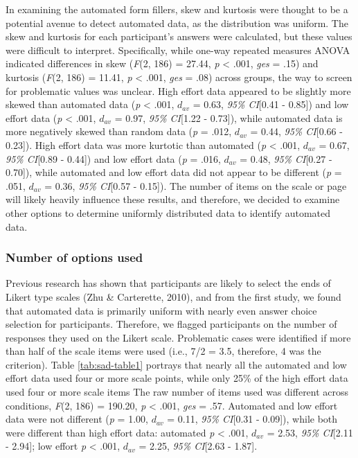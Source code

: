 \documentclass[english,man]{apa6}
\theoremstyle{definition}
\theoremstyle{definition}
\theoremstyle{definition}
\theoremstyle{remark}
\begin{document}
In examining the automated form fillers, skew and kurtosis were thought
to be a potential avenue to detect automated data, as the distribution
was uniform. The skew and kurtosis for each participant's answers were
calculated, but these values were difficult to interpret. Specifically,
while one-way repeated measures ANOVA indicated differences in skew
(\emph{F}(2, 186) = 27.44, \emph{p} \textless{} .001, \emph{ges} = .15)
and kurtosis (\emph{F}(2, 186) = 11.41, \emph{p} \textless{} .001,
\emph{ges} = .08) across groups, the way to screen for problematic
values was unclear. High effort data appeared to be slightly more skewed
than automated data (\emph{p} \textless{} .001, \(d_{av}\) = 0.63,
\emph{95\% CI}{[}0.41 - 0.85{]}) and low effort data (\emph{p}
\textless{} .001, \(d_{av}\) = 0.97, \emph{95\% CI}{[}1.22 - 0.73{]}),
while automated data is more negatively skewed than random data
(\emph{p} = .012, \(d_{av}\) = 0.44, \emph{95\% CI}{[}0.66 - 0.23{]}).
High effort data was more kurtotic than automated (\emph{p} \textless{}
.001, \(d_{av}\) = 0.67, \emph{95\% CI}{[}0.89 - 0.44{]}) and low effort
data (\emph{p} = .016, \(d_{av}\) = 0.48, \emph{95\% CI}{[}0.27 -
0.70{]}), while automated and low effort data did not appear to be
different (\emph{p} = .051, \(d_{av}\) = 0.36, \emph{95\% CI}{[}0.57 -
0.15{]}). The number of items on the scale or page will likely heavily
influence these results, and therefore, we decided to examine other
options to determine uniformly distributed data to identify automated
data.

\subsubsection{Number of options used}\label{number-of-options-used}

Previous research has shown that participants are likely to select the
ends of Likert type scales (Zhu \& Carterette, 2010), and from the first
study, we found that automated data is primarily uniform with nearly
even answer choice selection for participants. Therefore, we flagged
participants on the number of responses they used on the Likert scale.
Problematic cases were identified if more than half of the scale items
were used (i.e., 7/2 = 3.5, therefore, 4 was the criterion). Table
\ref{tab:sad-table1} portrays that nearly all the automated and low
effort data used four or more scale points, while only 25\% of the high
effort data used four or more scale items The raw number of items used
was different across conditions, \emph{F}(2, 186) = 190.20, \emph{p}
\textless{} .001, \emph{ges} = .57. Automated and low effort data were
not different (\emph{p} = 1.00, \(d_{av}\) = 0.11, \emph{95\% CI}{[}0.31
- 0.09{]}), while both were different than high effort data: automated
\emph{p} \textless{} .001, \(d_{av}\) = 2.53, \emph{95\% CI}{[}2.11 -
2.94{]}; low effort \emph{p} \textless{} .001, \(d_{av}\) = 2.25,
\emph{95\% CI}{[}2.63 - 1.87{]}.
\end{document}
